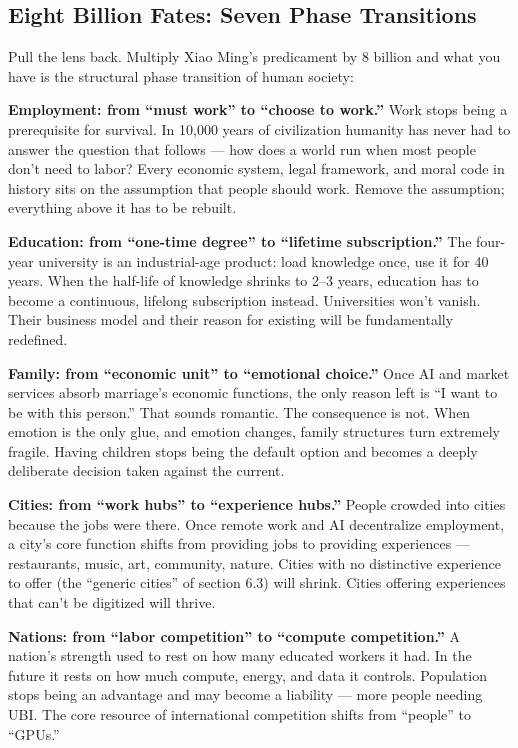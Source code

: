 \documentclass[11pt,a4paper]{article}
\begin{document}
\subsection{Eight Billion Fates: Seven Phase Transitions}

Pull the lens back. Multiply Xiao Ming's predicament by 8 billion and what you have is the structural phase transition of human society:

\textbf{Employment: from ``must work'' to ``choose to work.''} Work stops being a prerequisite for survival. In 10,000 years of civilization humanity has never had to answer the question that follows --- how does a world run when most people don't need to labor? Every economic system, legal framework, and moral code in history sits on the assumption that people should work. Remove the assumption; everything above it has to be rebuilt.

\textbf{Education: from ``one-time degree'' to ``lifetime subscription.''} The four-year university is an industrial-age product: load knowledge once, use it for 40 years. When the half-life of knowledge shrinks to 2--3 years, education has to become a continuous, lifelong subscription instead. Universities won't vanish. Their business model and their reason for existing will be fundamentally redefined.

\textbf{Family: from ``economic unit'' to ``emotional choice.''} Once AI and market services absorb marriage's economic functions, the only reason left is ``I want to be with this person.'' That sounds romantic. The consequence is not. When emotion is the only glue, and emotion changes, family structures turn extremely fragile. Having children stops being the default option and becomes a deeply deliberate decision taken against the current.

\textbf{Cities: from ``work hubs'' to ``experience hubs.''} People crowded into cities because the jobs were there. Once remote work and AI decentralize employment, a city's core function shifts from providing jobs to providing experiences --- restaurants, music, art, community, nature. Cities with no distinctive experience to offer (the ``generic cities'' of section 6.3) will shrink. Cities offering experiences that can't be digitized will thrive.

\textbf{Nations: from ``labor competition'' to ``compute competition.''} A nation's strength used to rest on how many educated workers it had. In the future it rests on how much compute, energy, and data it controls. Population stops being an advantage and may become a liability --- more people needing UBI. The core resource of international competition shifts from ``people'' to ``GPUs.''
\end{document}
